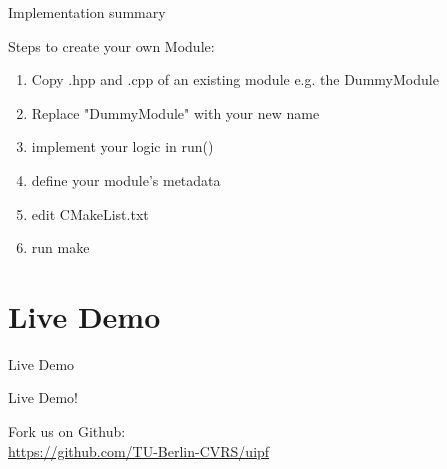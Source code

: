 \documentclass{beamer}
\begin{document}
\begin{frame}[fragile]{Implementation summary}

Steps to create your own Module:
	\begin{enumerate}
		\item Copy .hpp and .cpp of an existing module e.g. the DummyModule \pause
		\item Replace "DummyModule" with your new name \pause
		\item implement your logic in run()  \pause
		\item define your module's metadata \pause
		\item edit CMakeList.txt \pause
		\item run make
	\end{enumerate}


	\pnote{
	}

\end{frame}






\section{Live Demo}

\begin{frame}{Live Demo}

\begin{center}
	{\Huge
	Live Demo!}
	\vspace{2cm}

	Fork us on Github:\\\vspace{0.2cm}
	\url{https://github.com/TU-Berlin-CVRS/uipf}

\end{center}
\end{frame}
\end{document}

